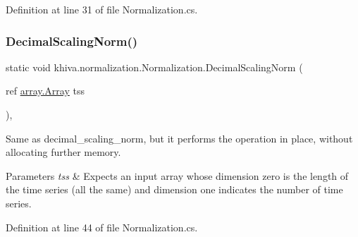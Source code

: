 Definition at line 31 of file Normalization.\+cs.

\mbox{\label{classkhiva_1_1normalization_1_1_normalization_acfd4bed1b714bd16d51831c207db9c11}} 
\subsubsection{\texorpdfstring{Decimal\+Scaling\+Norm()}{DecimalScalingNorm()}\hspace{0.1cm}{\footnotesize\ttfamily [2/2]}}
{\footnotesize\ttfamily static void khiva.\+normalization.\+Normalization.\+Decimal\+Scaling\+Norm (\begin{DoxyParamCaption}\item[{ref \mbox{\hyperlink{classkhiva_1_1array_1_1_array}{array.\+Array}}}]{tss }\end{DoxyParamCaption})\hspace{0.3cm}{\ttfamily [inline]}, {\ttfamily [static]}}



Same as decimal\+\_\+scaling\+\_\+norm, but it performs the operation in place, without allocating further memory. 


\begin{DoxyParams}{Parameters}
{\em tss} & Expects an input array whose dimension zero is the length of the time series (all the same) and dimension one indicates the number of time series.\\
\hline
\end{DoxyParams}


Definition at line 44 of file Normalization.\+cs.

\mbox{\label{classkhiva_1_1normalization_1_1_normalization_ab3eae533383b43c78d27aac6d61f257c}} 
